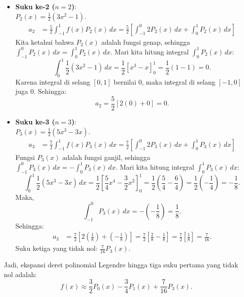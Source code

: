 \documentclass[12pt,openany,a4paper]{article}
\begin{document}
\begin{enumerate}
\begin{itemize}
          \item \textbf{Suku ke-2 ($n=2$)}:\\
                $P_2(x) = \frac{1}{2}(3x^2 - 1)$.
                \begin{align*}
                  a_2 & = \frac{5}{2} \int_{-1}^{1} f(x) P_2(x) \, dx = \frac{5}{2} \left[ \int_{-1}^{0} 2 P_2(x) \, dx + \int_{0}^{1} P_2(x) \, dx \right]
                \end{align*}
                Kita ketahui bahwa $P_2(x)$ adalah fungsi genap, sehingga $\int_{-1}^{0} P_2(x) \, dx = \int_{0}^{1} P_2(x) \, dx$.
                Mari kita hitung integral $\int_{0}^{1} P_2(x) \, dx$:
                \[\int_{0}^{1} \frac{1}{2}(3x^2 - 1) \, dx = \frac{1}{2} \left[ x^3 - x \right]_0^1 = \frac{1}{2} (1 - 1) = 0.\]
                Karena integral di selang $[0,1]$ bernilai $0$, maka integral di selang $[-1,0]$ juga $0$. Sehingga:
                \[a_2 = \frac{5}{2} [ 2(0) + 0 ] = 0.\]

          \item \textbf{Suku ke-3 ($n=3$)}:\\
                $P_3(x) = \frac{1}{2}(5x^3 - 3x)$.
                \begin{align*}
                  a_3 & = \frac{7}{2} \int_{-1}^{1} f(x) P_3(x) \, dx = \frac{7}{2} \left[ \int_{-1}^{0} 2 P_3(x) \, dx + \int_{0}^{1} P_3(x) \, dx \right]
                \end{align*}
                Fungsi $P_3(x)$ adalah fungsi ganjil, sehingga $\int_{-1}^{0} P_3(x) \, dx = -\int_{0}^{1} P_3(x) \, dx$.
                Mari kita hitung integral $\int_{0}^{1} P_3(x) \, dx$:
                \[\int_{0}^{1} \frac{1}{2}(5x^3 - 3x) \, dx = \frac{1}{2} \left[ \frac{5}{4}x^4 - \frac{3}{2}x^2 \right]_0^1 = \frac{1}{2} \left( \frac{5}{4} - \frac{6}{4} \right) = \frac{1}{2} \left( -\frac{1}{4} \right) = -\frac{1}{8}.\]
                Maka,
                \[\int_{-1}^{0} P_3(x) \, dx = -\left(-\frac{1}{8}\right) = \frac{1}{8}.\]
                Sehingga:
                \begin{align*}
                  a_3 & = \frac{7}{2} \left[ 2\left(\frac{1}{8}\right) + \left(-\frac{1}{8}\right) \right] = \frac{7}{2} \left[ \frac{2}{8} - \frac{1}{8} \right] = \frac{7}{2} \left[ \frac{1}{8} \right] = \frac{7}{16}.
                \end{align*}
                Suku ketiga yang tidak nol: $\frac{7}{16}P_3(x)$.
        \end{itemize}
        Jadi, ekspansi deret polinomial Legendre hingga tiga suku pertama yang tidak nol adalah:
        \[f(x) \approx \frac{3}{2}P_0(x) - \frac{3}{4}P_1(x) + \frac{7}{16}P_3(x).\]


\end{enumerate}
\end{document}
